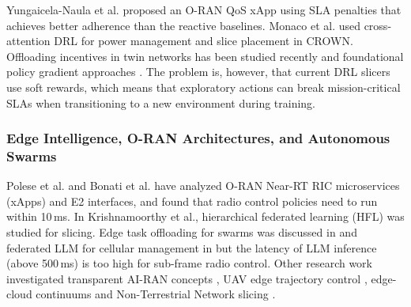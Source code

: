 \documentclass[twocolumn,10pt,twoside]{article}
\begin{document}
Yungaicela-Naula et al. \cite{yungaicela2026rslaq} proposed an O-RAN QoS xApp using SLA penalties that achieves better adherence than the reactive baselines. Monaco et al. \cite{monaco2026crown} used cross-attention DRL for power management and slice placement in CROWN. Offloading incentives in twin networks has been studied recently \cite{incentive2026offload} and foundational policy gradient approaches \cite{schulman2017ppo}. The problem is, however, that current DRL slicers use soft rewards, which means that exploratory actions can break mission-critical SLAs when transitioning to a new environment during training.

\subsubsection{Edge Intelligence, O-RAN Architectures, and Autonomous Swarms}
Polese et al. \cite{polese2023oran} and Bonati et al. \cite{bonati2022openrangym} have analyzed O-RAN Near-RT RIC microservices (xApps) and E2 interfaces, and found that radio control policies need to run within 10\,ms. In Krishnamoorthy et al., \cite{krishnamoorthy2026federated} hierarchical federated learning (HFL) was studied for slicing. Edge task offloading for swarms was discussed in \cite{edge2026autooffload} and federated LLM for cellular management in \cite{llm2026selforg} but the latency of LLM inference (above 500\,ms) is too high for sub-frame radio control. Other research work investigated transparent AI-RAN concepts \cite{iran2026transparent}, UAV edge trajectory control \cite{uav2026federated}, edge-cloud continuums \cite{edgecloud2026continuum} and Non-Terrestrial Network slicing \cite{ali2026aidriven}.
\end{document}

